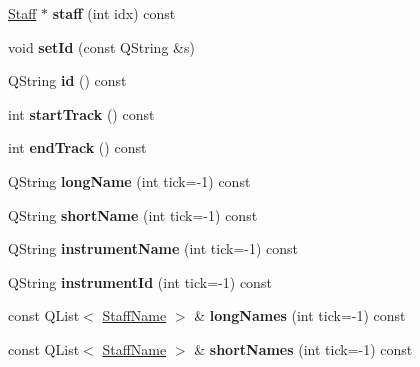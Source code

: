 \begin{DoxyCompactItemize}
\item 
\mbox{\label{class_ms_1_1_part_a3416c1062c8d4edc6247c8bdd11e00d8}} 
\hyperlink{class_ms_1_1_staff}{Staff} $\ast$ {\bfseries staff} (int idx) const
\item 
\mbox{\label{class_ms_1_1_part_a63fd6b97236309036cdb4915c28a5aec}} 
void {\bfseries set\+Id} (const Q\+String \&s)
\item 
\mbox{\label{class_ms_1_1_part_af48dff3059219a41c066b0a1fd57da93}} 
Q\+String {\bfseries id} () const
\item 
\mbox{\label{class_ms_1_1_part_a9cf90028e8f1f9610b16ac63eb41a506}} 
int {\bfseries start\+Track} () const
\item 
\mbox{\label{class_ms_1_1_part_abe6771ce7c8d60d52b17d5f5497fdc17}} 
int {\bfseries end\+Track} () const
\item 
\mbox{\label{class_ms_1_1_part_a87d506614249ba738f425e5080780e2d}} 
Q\+String {\bfseries long\+Name} (int tick=-\/1) const
\item 
\mbox{\label{class_ms_1_1_part_adf6f20ecdfe5a1b7d805e9b72178eac2}} 
Q\+String {\bfseries short\+Name} (int tick=-\/1) const
\item 
\mbox{\label{class_ms_1_1_part_a6506b0c7432b5ec91531ac12ef4856bc}} 
Q\+String {\bfseries instrument\+Name} (int tick=-\/1) const
\item 
\mbox{\label{class_ms_1_1_part_a3a5d1cfa9defe73184bc09f68a09eb5b}} 
Q\+String {\bfseries instrument\+Id} (int tick=-\/1) const
\item 
\mbox{\label{class_ms_1_1_part_af15449a37af5d08e9aa3270aeb3217ad}} 
const Q\+List$<$ \hyperlink{class_ms_1_1_staff_name}{Staff\+Name} $>$ \& {\bfseries long\+Names} (int tick=-\/1) const
\item 
\mbox{\label{class_ms_1_1_part_a06bb42cac9ddd1507f1918ec0b628404}} 
const Q\+List$<$ \hyperlink{class_ms_1_1_staff_name}{Staff\+Name} $>$ \& {\bfseries short\+Names} (int tick=-\/1) const

\end{DoxyCompactItemize}

